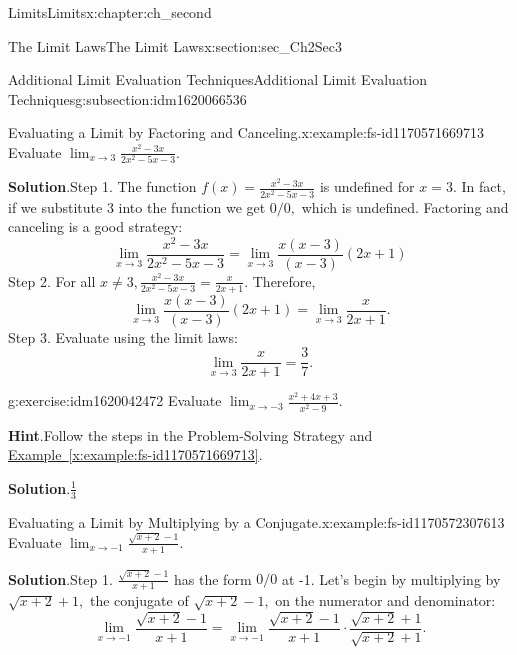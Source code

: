 \documentclass[oneside,10pt,]{book}
\newcommand{\blocktitlefont}{\relax}
\newcommand{\xreffont}{\relax}
\numberwithin{equation}{section}
\begin{document}
\begin{chapterptx}{Limits}{}{Limits}{}{}{x:chapter:ch_second}
\begin{sectionptx}{The Limit Laws}{}{The Limit Laws}{}{}{x:section:sec_Ch2Sec3}
\begin{subsectionptx}{Additional Limit Evaluation Techniques}{}{Additional Limit Evaluation Techniques}{}{}{g:subsection:idm1620066536}
\begin{example}{Evaluating a Limit by Factoring and Canceling.}{x:example:fs-id1170571669713}%
Evaluate \(\lim_{x \to 3 }\frac{x^2-3x}{2x^2-5x-3}.\)%
\par\smallskip%
\noindent\textbf{\blocktitlefont Solution}.\hypertarget{g:solution:idm1620045160}{}\quad{}Step 1. The function \(f(x)=\frac{x^2-3x}{2x^2-5x-3}\) is undefined for \(x=3.\) In fact, if we substitute 3 into the function we get \(0/0,\) which is undefined. Factoring and canceling is a good strategy:%
%
\begin{equation*}
\lim_{x \to 3 }\frac{x^2-3x}{2x^2-5x-3}=\lim_{x \to 3 }\frac{x(x-3)}{(x-3)}{(2x+1)}
\end{equation*}
Step 2. For all \(x\neq 3,\frac{x^2-3x}{2x^2-5x-3}=\frac{x}{2x+1}.\) Therefore,%
%
\begin{equation*}
\lim_{x \to 3 }\frac{x(x-3)}{(x-3)}{(2x+1)}=\lim_{x \to 3 }\frac{x}{2x+1}.
\end{equation*}
Step 3. Evaluate using the limit laws:%
%
\begin{equation*}
\lim_{x \to 3 }\frac{x}{2x+1}=\frac{3}{7}.
\end{equation*}
\end{example}
\begin{inlineexercise}{}{g:exercise:idm1620042472}%
Evaluate \(\lim_{x \to -3 }\frac{x^2+4x+3}{x^2-9}.\)%
\par\smallskip%
\noindent\textbf{\blocktitlefont Hint}.\hypertarget{g:hint:idm1620039144}{}\quad{}Follow the steps in the Problem-Solving Strategy and \hyperref[x:example:fs-id1170571669713]{Example~{\xreffont\ref{x:example:fs-id1170571669713}}}.%
\par\smallskip%
\noindent\textbf{\blocktitlefont Solution}.\hypertarget{g:solution:idm1620037608}{}\quad{}\(\frac{1}{3}\)%
\end{inlineexercise}%
\begin{example}{Evaluating a Limit by Multiplying by a Conjugate.}{x:example:fs-id1170572307613}%
Evaluate \(\lim_{x \to -1 }\frac{\sqrt{x+2}-1}{x+1}.\)%
\par\smallskip%
\noindent\textbf{\blocktitlefont Solution}.\hypertarget{g:solution:idm1620565480}{}\quad{}Step 1. \(\frac{\sqrt{x+2}-1}{x+1}\) has the form \(0/0\) at -1. Let’s begin by multiplying by \(\sqrt{x+2}+1,\) the conjugate of \(\sqrt{x+2}-1,\) on the numerator and denominator:%
%
\begin{equation*}
\lim_{x \to -1 }\frac{\sqrt{x+2}-1}{x+1}=\lim_{x \to -1 }\frac{\sqrt{x+2}-1}{x+1}\cdot \frac{\sqrt{x+2}+1}{\sqrt{x+2}+1}.

\end{equation*}
\end{example}
\end{subsectionptx}
\end{sectionptx}
\end{chapterptx}
\end{document}

